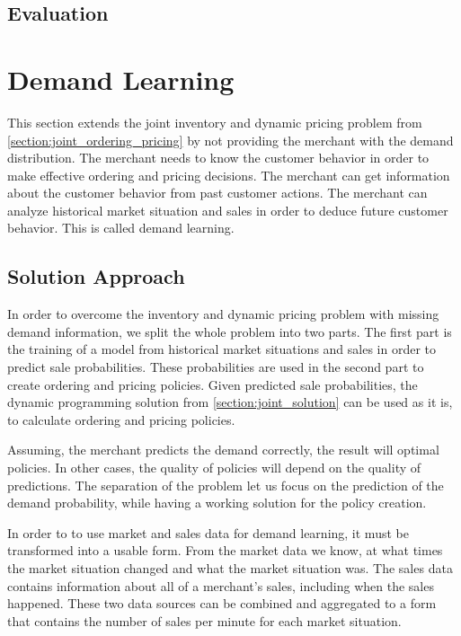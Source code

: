 \subsection{Evaluation}

\section{Demand Learning}
\label{section:demand_learning}

This section extends the joint inventory and dynamic pricing problem from \cref{section:joint_ordering_pricing} by not providing the merchant with the demand distribution.
The merchant needs to know the customer behavior in order to make effective ordering and pricing decisions.
The merchant can get information about the customer behavior from past customer actions.
The merchant can analyze historical market situation and sales in order to deduce future customer behavior.
This is called demand learning.



\subsection{Solution Approach}
In order to overcome the inventory and dynamic pricing problem with missing demand information, we split the whole problem into two parts.
The first part is the training of a model from historical market situations and sales in order to predict sale probabilities.
These probabilities are used in the second part to create ordering and pricing policies.
Given predicted sale probabilities, the dynamic programming solution from \cref{section:joint_solution} can be used as it is, to calculate ordering and pricing policies.

Assuming, the merchant predicts the demand correctly, the result will optimal policies.
In other cases, the quality of policies will depend on the quality of predictions. 
The separation of the problem let us focus on the prediction of the demand probability, while having a working solution for the policy creation.

In order to to use market and sales data for demand learning, it must be transformed into a usable form.
From the market data we know, at what times the market situation changed and what the market situation was.
The sales data contains information about all of a merchant's sales, including when the sales happened.
These two data sources can be combined and aggregated to a form that contains the number of sales per minute for each market situation.

